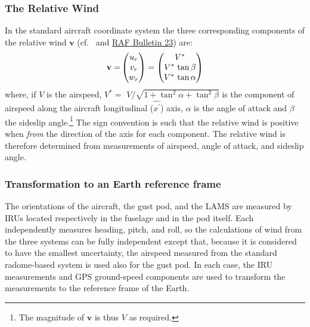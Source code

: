 \documentclass[12pt,twoside,english]{article}\usepackage[]{graphicx}\usepackage[]{color}
\let\OrgIndex\index
\renewcommand*{\index}[1]{\OrgIndex{#1}}
\begin{document}
\subsubsection{The Relative Wind\label{sub:The-Relative-Wind}}

In the standard aircraft coordinate system the three corresponding components of the relative wind $\mathbf{v}$ (cf.~\citet{NCAR_OpenSky_TECH-NOTE-000-000-000-064} and \href{https://www.eol.ucar.edu/raf/Bulletins/bulletin23.html}{RAF Bulletin 23}) are:\\
\begin{equation}
\mathbf{v=}\begin{pmatrix}u_{r}\\ v_{r}\\ w_{r} 
\end{pmatrix}=\begin{pmatrix}V^{*}\\ V^{*}\thinspace\tan\beta\\ V^{*}\thinspace\tan\alpha 
\end{pmatrix}\label{eq:relative wind}
\end{equation}
where, if $V$ is the airspeed, $V^{*}=$ $V/\sqrt{1+\tan^{2}\alpha+\tan^{2}\beta}$ is the component of airspeed along the aircraft longitudinal ($\hat{x^{\prime}}$) axis, $\alpha$ is the angle of attack and $\beta$ the sideslip angle.\footnote{The magnitude of $\mathbf{v}$ is thus $V$ as required.} The sign convention is such that the relative wind is positive when \emph{from} the direction of the axis for each component. The relative wind is therefore determined from measurements of airspeed, angle of attack, and sideslip angle. 


\subsubsection{Transformation to an Earth reference frame\label{sub:EarthRef}}

The orientations of the aircraft, the gust pod, and the LAMS are measured by IRUs located respectively in the fuselage and in the pod itself. Each independently measures heading, pitch, and roll, so the calculations of wind from the three systems can be fully independent except that, because it is considered to have the smallest uncertainty, the airspeed measured from the standard radome-based system is used also for the gust pod. In each case, the IRU measurements and GPS ground-speed components are used to transform the measurements to the reference frame of the Earth. 
\end{document}
